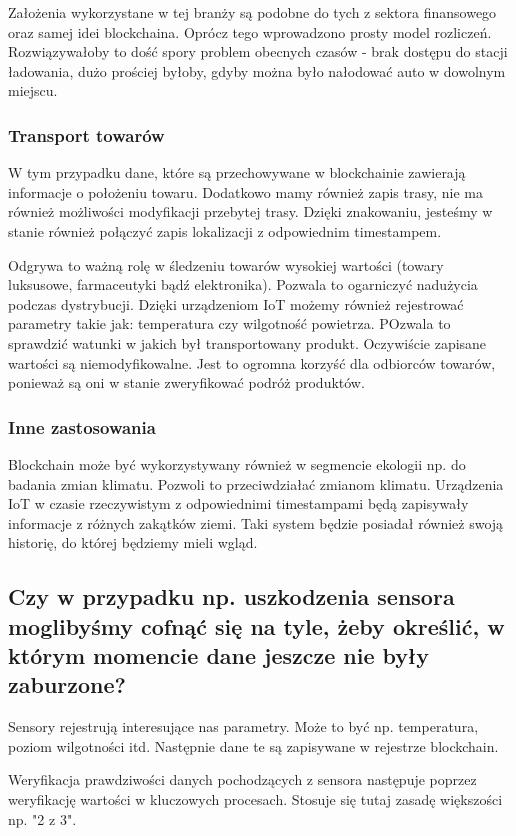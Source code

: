\documentclass[12pt]{article}
\begin{document}
Założenia wykorzystane w tej branży są podobne do tych z sektora finansowego oraz samej idei blockchaina. Oprócz tego wprowadzono prosty model rozliczeń. Rozwiązywałoby to dość spory problem obecnych czasów - brak dostępu do stacji ładowania, dużo prościej byłoby, gdyby można było nałodować auto w dowolnym miejscu.


\subsubsection{Transport towarów}
W tym przypadku dane, które są przechowywane w blockchainie zawierają informacje o położeniu towaru. Dodatkowo mamy również zapis trasy, nie ma również możliwości modyfikacji przebytej trasy. Dzięki znakowaniu, jesteśmy w stanie również połączyć zapis lokalizacji z odpowiednim timestampem. 

Odgrywa to ważną rolę w śledzeniu towarów wysokiej wartości (towary luksusowe, farmaceutyki bądź elektronika). Pozwala to ogarniczyć nadużycia podczas dystrybucji.
Dzięki urządzeniom IoT możemy również rejestrować parametry takie jak: temperatura czy wilgotność powietrza. POzwala to sprawdzić watunki w jakich był transportowany produkt. Oczywiście zapisane wartości są niemodyfikowalne. Jest to ogromna korzyść dla odbiorców towarów, ponieważ są oni w stanie zweryfikować podróż produktów.

\subsubsection{Inne zastosowania}
Blockchain może być wykorzystywany również w segmencie ekologii np. do badania zmian klimatu. Pozwoli to przeciwdziałać zmianom klimatu. Urządzenia IoT w czasie rzeczywistym z odpowiednimi timestampami będą zapisywały informacje z różnych zakątków ziemi. Taki system będzie posiadał również swoją historię, do której będziemy mieli wgląd.



\subsection{Czy w przypadku np. uszkodzenia sensora moglibyśmy cofnąć się na tyle, żeby określić, w którym momencie dane jeszcze nie były zaburzone?}

Sensory rejestrują interesujące nas parametry. Może to być np. temperatura, poziom wilgotności itd. Następnie dane te są zapisywane w rejestrze blockchain. 

Weryfikacja prawdziwości danych pochodzących z sensora następuje poprzez weryfikację wartości w kluczowych procesach. Stosuje się tutaj zasadę większości np. "2 z 3".
\end{document}
